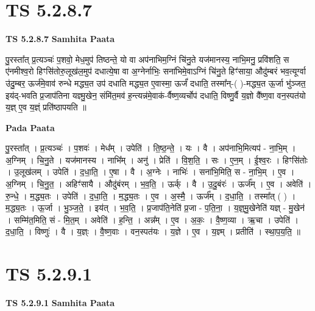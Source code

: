 \documentclass[17pt]{extarticle}
\begin{document}
\section*{ TS 5.2.8.7 }

\textbf{TS 5.2.8.7 } \newline
\textbf{Samhita Paata} \newline

पु॒रस्ता᳚त् प्र॒त्यञ्चः॑ प॒शवो॒ मेध॒मुप॑ तिष्ठन्ते॒ यो वा अप॑नाभिम॒ग्निं चि॑नु॒ते यज॑मानस्य॒ नाभि॒मनु॒ प्रवि॑शति॒ स ए॑नमीश्व॒रो हिꣳसि॑तोरु॒लूख॑ल॒मुप॑ दधात्ये॒षा वा अ॒ग्नेर्नाभिः॒ सना॑भिमे॒वाऽग्निं चि॑नु॒ते हिꣳ॑साया॒ औदु॑म्बरं भव॒त्यूर्ग्वा उ॑दु॒म्बर॒ ऊर्ज॑मे॒वाव॑ रुन्धे मद्ध्य॒त उप॑ दधाति मद्ध्य॒त ए॒वास्मा॒ ऊर्जं॑ दधाति॒ तस्मा᳚न्-( )-मद्ध्य॒त ऊ॒र्जा भु॑ञ्जत॒ इय॑द्-भवति प्र॒जाप॑तिना यज्ञ्मु॒खेन॒ संमि॑त॒मव॑ ह॒न्त्यन्न॑मे॒वाक॑-र्वैष्ण॒व्यर्चोप॑ दधाति॒ विष्णु॒र्वै य॒ज्ञो वै᳚ष्ण॒वा वन॒स्पत॑यो य॒ज्ञ् ए॒व य॒ज्ञ्ं प्रति॑ष्ठापयति ॥ \newline

\textbf{Pada Paata} \newline

पु॒रस्ता᳚त् । प्र॒त्यञ्चः॑ । प॒शवः॑ । मेध᳚म् । उपेति॑ । ति॒ष्ठ॒न्ते॒ । यः । वै । अप॑नाभि॒मित्यप॑ - ना॒भि॒म् । अ॒ग्निम् । चि॒नु॒ते । यज॑मानस्य । नाभि᳚म् । अनु॑ । प्रेति॑ । वि॒श॒ति॒ । सः । ए॒न॒म् । ई॒श्व॒रः । हिꣳसि॑तोः । उ॒लूख॑लम् । उपेति॑ । द॒धा॒ति॒ । ए॒षा । वै । अ॒ग्नेः । नाभिः॑ । सना॑भि॒मिति॒ स - ना॒भि॒म् । ए॒व । अ॒ग्निम् । चि॒नु॒त॒ । अहिꣳ॑सायै । औदु॑बंरम् । भ॒व॒ति॒ । ऊर्क् । वै । उ॒दु॒बंरः॑ । ऊर्ज᳚म् । ए॒व । अवेति॑ । रु॒न्धे॒ । म॒द्ध्य॒तः । उपेति॑ । द॒धा॒ति॒ । म॒द्ध्य॒तः । ए॒व । अ॒स्मै॒ । ऊर्ज᳚म् । द॒धा॒ति॒ । तस्मा᳚त् ( ) । म॒द्ध्य॒तः । ऊ॒र्जा । भु॒ञ्ज॒ते॒ । इय॑त् । भ॒व॒ति॒ । प्र॒जाप॑ति॒नेति॑ प्र॒जा - प॒ति॒ना॒ । य॒ज्ञ्॒मु॒खेनेति॑ यज्ञ् - मु॒खेन॑ । सम्मि॑त॒मिति॒ सं - मि॒त॒म् । अवेति॑ । ह॒न्ति॒ । अन्न᳚म् । ए॒व । अ॒कः॒ । वै॒ष्ण॒व्या । ऋ॒चा । उपेति॑ । द॒धा॒ति॒ । विष्णुः॑ । वै । य॒ज्ञ्ः । वै॒ष्ण॒वाः । वन॒स्पत॑यः । य॒ज्ञे । ए॒व । य॒ज्ञ्म् । प्रतीति॑ । स्था॒प॒य॒ति॒ ॥  \newline




\section*{ TS 5.2.9.1 }

\textbf{TS 5.2.9.1 } \newline
\textbf{Samhita Paata} \newline
\end{document}

